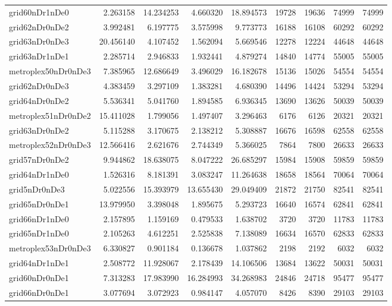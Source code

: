 \begin{longtable}{|l|r|r|r|r|r|r|r|r|}
grid60nDr1nDe0 & 2.263158 & 14.234253 & 4.660320 & 18.894573 & 19728 & 19636 & 74999 & 74999 \\
grid62nDr0nDe2 & 3.992481 & 6.197775 & 3.575998 & 9.773773 & 16188 & 16108 & 60292 & 60292 \\
grid63nDr0nDe3 & 20.456140 & 4.107452 & 1.562094 & 5.669546 & 12278 & 12224 & 44648 & 44648 \\
grid63nDr1nDe1 & 2.285714 & 2.946833 & 1.932441 & 4.879274 & 14840 & 14774 & 55005 & 55005 \\
metroplex50nDr0nDe3 & 7.385965 & 12.686649 & 3.496029 & 16.182678 & 15136 & 15026 & 54554 & 54554 \\
grid62nDr0nDe3 & 4.383459 & 3.297109 & 1.383281 & 4.680390 & 14496 & 14424 & 53294 & 53294 \\
grid64nDr0nDe2 & 5.536341 & 5.041760 & 1.894585 & 6.936345 & 13690 & 13626 & 50039 & 50039 \\
metroplex51nDr0nDe2 & 15.411028 & 1.799056 & 1.497407 & 3.296463 & 6176 & 6126 & 20321 & 20321 \\
grid63nDr0nDe2 & 5.115288 & 3.170675 & 2.138212 & 5.308887 & 16676 & 16598 & 62558 & 62558 \\
metroplex52nDr0nDe3 & 12.566416 & 2.621676 & 2.744349 & 5.366025 & 7864 & 7800 & 26633 & 26633 \\
grid57nDr0nDe2 & 9.944862 & 18.638075 & 8.047222 & 26.685297 & 15984 & 15908 & 59859 & 59859 \\
grid64nDr1nDe0 & 1.526316 & 8.181391 & 3.083247 & 11.264638 & 18658 & 18564 & 70064 & 70064 \\
grid5nDr0nDe3 & 5.022556 & 15.393979 & 13.655430 & 29.049409 & 21872 & 21750 & 82541 & 82541 \\
grid65nDr0nDe1 & 13.979950 & 3.398048 & 1.895675 & 5.293723 & 16640 & 16574 & 62841 & 62841 \\
grid66nDr1nDe0 & 2.157895 & 1.159169 & 0.479533 & 1.638702 & 3720 & 3720 & 11783 & 11783 \\
grid65nDr1nDe0 & 2.105263 & 4.612251 & 2.525838 & 7.138089 & 16634 & 16570 & 62833 & 62833 \\
metroplex53nDr0nDe3 & 6.330827 & 0.901184 & 0.136678 & 1.037862 & 2198 & 2192 & 6032 & 6032 \\
grid64nDr1nDe1 & 2.508772 & 11.928067 & 2.178439 & 14.106506 & 13684 & 13622 & 50031 & 50031 \\
grid60nDr0nDe1 & 7.313283 & 17.983990 & 16.284993 & 34.268983 & 24846 & 24718 & 95477 & 95477 \\
grid66nDr0nDe1 & 3.077694 & 3.072923 & 0.984147 & 4.057070 & 8426 & 8390 & 29103 & 29103 \\

\end{longtable}
